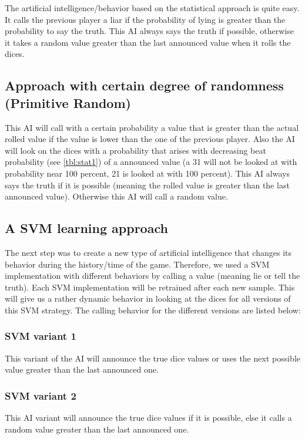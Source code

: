 \documentclass[11pt]{article}
\begin{document}
The artificial intelligence/behavior based on the statistical approach is quite easy. It calls the previous player a liar if the probability of lying is greater than the probability to say the truth.
This AI always says the truth if possible, otherwise it takes a random value greater than the last announced value when it rolls the dices.


\subsection{Approach with certain degree of randomness (Primitive Random)}
\label{ssec:primitive}
This AI will call with a certain probability a value that is greater than the actual rolled value if the value is lower than the one of the previous player. Also the AI will look on the dices with a probability that arises with decreasing beat probability (see \cref{tbl:stat1}) of a announced value (a 31 will not be looked at with probability near 100 percent, 21 is looked at with 100 percent). This AI always says the truth if it is possible (meaning the rolled value is greater than the last announced value). Otherwise this AI will call a random value.

\subsection{A SVM learning approach}
The next step was to create a new type of artificial intelligence that changes its behavior during the history/time of the game.
Therefore, we used a SVM implementation with different behaviors by calling a value (meaning lie or tell the truth). Each SVM implementation will be retrained after each new sample. This will give us a rather dynamic behavior in looking at the dices for all versions of this SVM strategy. The calling behavior for the different versions are listed below:

\subsubsection{SVM variant 1}
\label{sssec:svm1}
This variant of the AI will announce the true dice values or uses the next possible value greater than the last announced one.

\subsubsection{SVM variant 2}
\label{sssec:svm2}
This AI variant will announce the true dice values if it is possible, else it calls a random value greater than the last announced one. 
\end{document}
